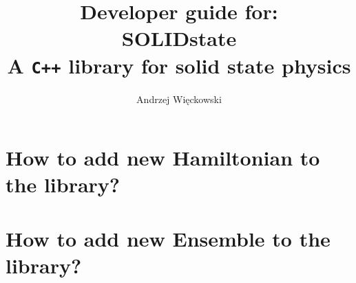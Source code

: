 \documentclass{article}
\begin{document}
\title{\textbf{Developer guide for:}\\ \textbf{\textsf{SOLIDstate}}\\[1ex] \normalsize A \texttt{C++} library for solid state physics}
\author{Andrzej Więckowski} %

\maketitle

\newpage

\tableofcontents
 
\section{How to add new Hamiltonian to the library?}
\section{How to add new Ensemble to the library?}
\end{document}
